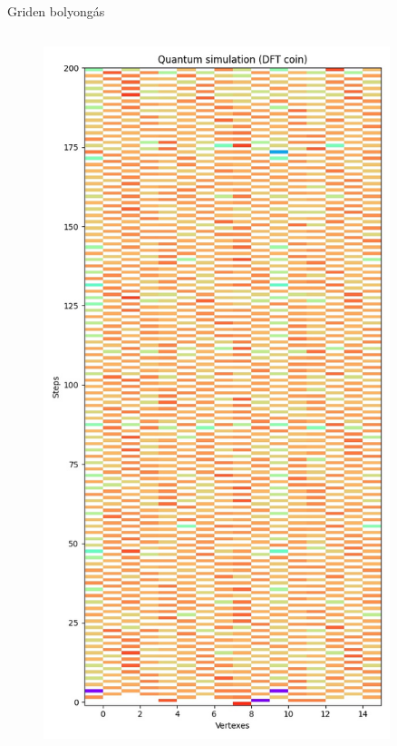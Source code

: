 \documentclass[aspectratio=169]{beamer}
\begin{document}
\begin{frame}{Griden bolyongás}
\begin{columns}[onlytextwidth]
\begin{column}{.23\textwidth}
\begin{figure}
        \includegraphics[width=0.9\textwidth]{./tdk_figures/results/grid/dft.jpg}
      \end{figure}
    \end{column}
  \end{columns}
\end{frame}
\end{document}
